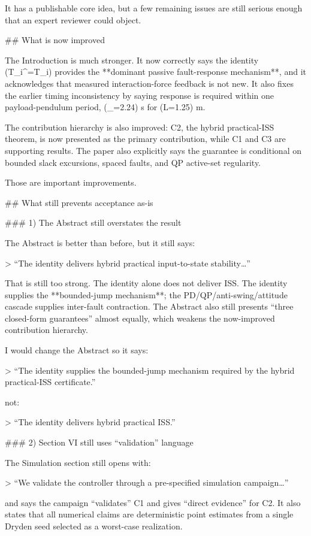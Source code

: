 It has a publishable core idea, but a few remaining issues are still serious enough that an expert reviewer could object.

## What is now improved

The Introduction is much stronger. It now correctly says the identity (T_i^{}=T_i) provides the **dominant passive fault-response mechanism**, and it acknowledges that measured interaction-force feedback is not new. It also fixes the earlier timing inconsistency by saying response is required within one payload-pendulum period, (\tau_{}=2.24) s for (L=1.25) m.

The contribution hierarchy is also improved: C2, the hybrid practical-ISS theorem, is now presented as the primary contribution, while C1 and C3 are supporting results. The paper also explicitly says the guarantee is conditional on bounded slack excursions, spaced faults, and QP active-set regularity.

Those are important improvements.

## What still prevents acceptance as-is

### 1) The Abstract still overstates the result

The Abstract is better than before, but it still says:

> “The identity delivers hybrid practical input-to-state stability…”

That is still too strong. The identity alone does not deliver ISS. The identity supplies the **bounded-jump mechanism**; the PD/QP/anti-swing/attitude cascade supplies inter-fault contraction. The Abstract also still presents “three closed-form guarantees” almost equally, which weakens the now-improved contribution hierarchy.

I would change the Abstract so it says:

> “The identity supplies the bounded-jump mechanism required by the hybrid practical-ISS certificate.”

not:

> “The identity delivers hybrid practical ISS.”

### 2) Section VI still uses “validation” language

The Simulation section still opens with:

> “We validate the controller through a pre-specified simulation campaign…”

and says the campaign “validates” C1 and gives “direct evidence” for C2. It also states that all numerical claims are deterministic point estimates from a single Dryden seed selected as a worst-case realization.

